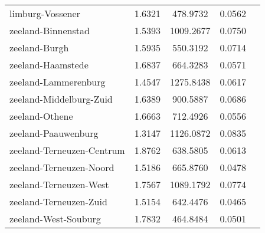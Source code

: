 \begin{longtable}{llccc}
limburg-Vossener & 1.6321 & 478.9732 & 0.0562 \\
zeeland-Binnenstad & 1.5393 & 1009.2677 & 0.0750 \\
zeeland-Burgh & 1.5935 & 550.3192 & 0.0714 \\
zeeland-Haamstede & 1.6837 & 664.3283 & 0.0571 \\
zeeland-Lammerenburg & 1.4547 & 1275.8438 & 0.0617 \\
zeeland-Middelburg-Zuid & 1.6389 & 900.5887 & 0.0686 \\
zeeland-Othene & 1.6663 & 712.4926 & 0.0556 \\
zeeland-Paauwenburg & 1.3147 & 1126.0872 & 0.0835 \\
zeeland-Terneuzen-Centrum & 1.8762 & 638.5805 & 0.0613 \\
zeeland-Terneuzen-Noord & 1.5186 & 665.8760 & 0.0478 \\
zeeland-Terneuzen-West & 1.7567 & 1089.1792 & 0.0774 \\
zeeland-Terneuzen-Zuid & 1.5154 & 642.4476 & 0.0465 \\
zeeland-West-Souburg & 1.7832 & 464.8484 & 0.0501 \\
\hline
\end{longtable}
